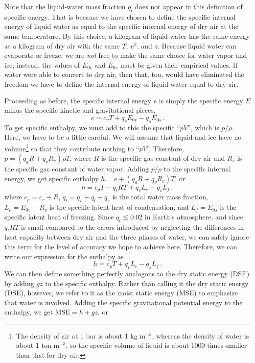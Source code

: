 \documentclass[12pt]{article}
\begin{document}
Note that the liquid-water mass fraction $q_l$ does not appear in this definition of specific energy.  That is because we have chosen to define the specific internal energy of liquid water as equal to the specific internal energy of dry air at the same temperature.  By this choice, a kilogram of liquid water has the same energy as a kilogram of dry air with the same $T$, $u^2$, and $z$.  Because liquid water can evaporate or freeze, we are {\it not} free to make the same choice for water vapor and ice; instead, the values of $E_{0v}$ and $E_{0s}$ must be given their empirical values.  If water were able to convert to dry air, then that, too, would have eliminated the freedom we have to define the internal energy of liquid water equal to dry air.


Proceeding as before, the specific internal energy $e$ is simply the specific energy $E$ minus the specific kinetic and gravitational pieces,
\begin{equation}
e = c_v T + q_v E_{0v} - q_s E_{0s} \, .
\end{equation}
To get specific enthalpy, we must add to this the specific  ``$pV$'', which is $p/\rho$.  Here, we have to be a little careful.  We will assume that liquid and ice have no volume\footnote{The density of air at 1 bar is about 1 kg m$^{-3}$, whereas the density of water is about 1 ton m$^{-3}$, so the specific volume of liquid is about 1000 times smaller than that for dry air.} so that they contribute nothing to ``$pV$''.  Therefore, $p = (q_a R + q_v R_v) \rho T$, where $R$ is the specific gas constant of dry air and $R_v$ is the specific gas constant of water vapor.  Adding $p/\rho$ to the specific internal energy, we get specific enthalpy $h = e + (q_a R + q_v R_v)T$, or
\[
h = c_p T - q_t R T + q_v L_c - q_s L_f \, ,
\]
where $c_p = c_v + R$, $q_t = q_v + q_l + q_s$ is the total water mass fraction, $L_c = E_{0v} + R_v$ is the specific latent heat of condensation, and $L_f = E_{0s}$ is the specific latent heat of freezing.  Since $q_t \lesssim 0.02$ in Earth's atmosphere, and since $q_t RT$ is small compared to the errors introduced by neglecting the differences in heat capacity between dry air and the three phases of water, we can safely ignore this term for the level of accuracy we hope to achieve here.  Therefore, we can write our expression for the enthalpy as
\begin{equation}
h = c_p T + q_v L_c - q_s L_f \, .
\end{equation}
We can then define something perfectly analogous to the dry static energy (DSE) by adding $gz$ to the specific enthalpy.  Rather than calling it the dry static energy (DSE), however, we refer to it as the moist static energy (MSE) to emphasize that water is involved.  Adding the specific gravitational potential energy to the enthalpy, we get $\text{MSE} = h + gz$, or
\end{document}
